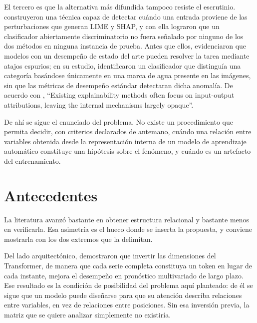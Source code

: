 El tercero es que la alternativa más difundida tampoco resiste el escrutinio. \textcite{slack2020fooling} construyeron una técnica capaz de detectar cuándo una entrada proviene de las perturbaciones que generan LIME y SHAP, y con ella lograron que un clasificador abiertamente discriminatorio no fuera señalado por ninguno de los dos métodos en ninguna instancia de prueba. Antes que ellos, \textcite{lapuschkin2019unmasking} evidenciaron que modelos con un desempeño de estado del arte pueden resolver la tarea mediante atajos espurios; en su estudio, identificaron un clasificador que distinguía una categoría basándose únicamente en una marca de agua presente en las imágenes, sin que las métricas de desempeño estándar detectaran dicha anomalía. De acuerdo con \textcite{mechinterp2025ts}, ``Existing explainability methods often focus on input-output attributions, leaving the internal mechanisms largely opaque''.

De ahí se sigue el enunciado del problema. No existe un procedimiento que permita decidir, con criterios declarados de antemano, cuándo una relación entre variables obtenida desde la representación interna de un modelo de aprendizaje automático constituye una hipótesis sobre el fenómeno, y cuándo es un artefacto del entrenamiento.

\section{Antecedentes}

La literatura avanzó bastante en obtener estructura relacional y bastante menos en verificarla. Esa asimetría es el hueco donde se inserta la propuesta, y conviene mostrarla con los dos extremos que la delimitan.

Del lado arquitectónico, \textcite{liu2024itransformer} demostraron que invertir las dimensiones del Transformer, de manera que cada serie completa constituya un token en lugar de cada instante, mejora el desempeño en pronóstico multivariado de largo plazo. Ese resultado es la condición de posibilidad del problema aquí planteado: de él se sigue que un modelo puede diseñarse para que su atención describa relaciones entre variables, en vez de relaciones entre posiciones. Sin esa inversión previa, la matriz que se quiere analizar simplemente no existiría.

